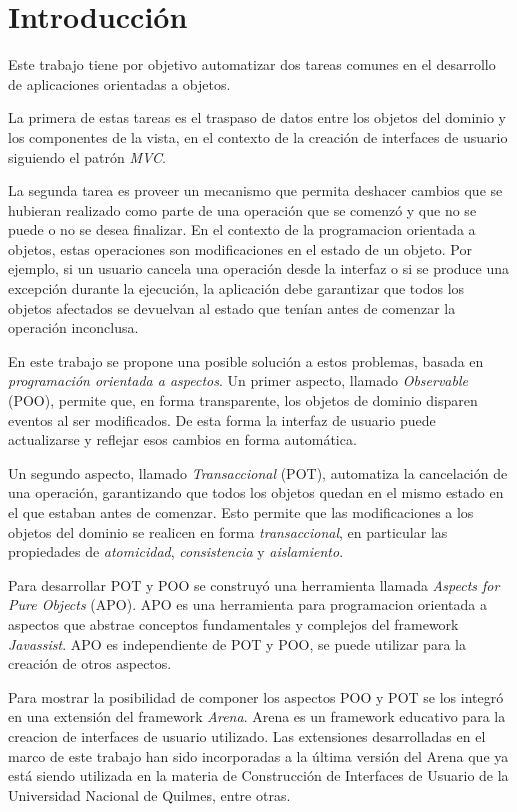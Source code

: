 \section{Introducción}

Este trabajo tiene por objetivo automatizar dos tareas comunes en el
desarrollo de aplicaciones orientadas a objetos.

La primera de estas tareas es el traspaso de datos entre los objetos del dominio
y los componentes de la vista, en el contexto de la creación de interfaces de
usuario siguiendo el patrón \emph{MVC}.
 
La segunda tarea es proveer un mecanismo que permita deshacer cambios que se
hubieran realizado como parte de una operación que se comenzó y que no se puede
o no se desea finalizar.
En el contexto de la programacion orientada a objetos, estas operaciones son
modificaciones en el estado de un objeto.
Por ejemplo, si un usuario cancela una operación desde
la interfaz o si se produce una excepción durante la ejecución, la aplicación
debe garantizar que todos los objetos afectados se devuelvan al estado que
tenían antes de comenzar la operación inconclusa.

\medskip 

En este trabajo se propone una posible solución a estos problemas, basada en
\emph{programación orientada a aspectos}.
Un primer aspecto, llamado \emph{Observable} (POO), permite que, en forma
transparente, los objetos de dominio disparen eventos al ser modificados.
De esta forma la interfaz de usuario puede actualizarse y reflejar esos
cambios en forma automática.

Un segundo aspecto, llamado \emph{Transaccional} (POT), automatiza la
cancelación de una operación, garantizando que todos los objetos quedan en el
mismo estado en el que estaban antes de comenzar. 
Esto permite que las modificaciones a los objetos del dominio se realicen
en forma \emph{transaccional}, en particular las propiedades de
\emph{atomicidad}, \emph{consistencia} y \emph{aislamiento}.

Para desarrollar POT y POO se construyó una herramienta llamada
\emph{Aspects for Pure Objects} (APO).
APO es una herramienta para programacion orientada a aspectos que abstrae
conceptos fundamentales y complejos del framework \emph{Javassist}. 
APO es independiente de POT y POO, se puede utilizar
para la creación de otros aspectos.

Para mostrar la posibilidad de componer los aspectos POO y POT se los integró en
una extensión del framework \emph{Arena}.
Arena es un framework educativo para la creacion de interfaces de usuario
utilizado.
Las extensiones desarrolladas en el marco de este trabajo han sido incorporadas
a la última versión del Arena que ya está siendo utilizada en la materia de
Construcción de Interfaces de Usuario de la Universidad Nacional de Quilmes,
entre otras.

